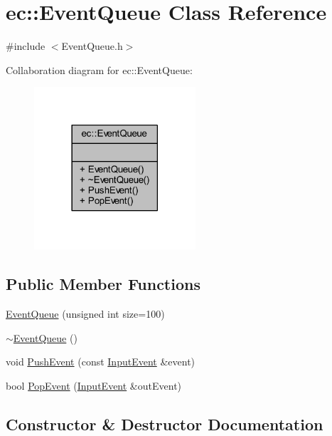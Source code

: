 \hypertarget{classec_1_1_event_queue}{}\section{ec\+:\+:Event\+Queue Class Reference}
\label{classec_1_1_event_queue}


{\ttfamily \#include $<$Event\+Queue.\+h$>$}



Collaboration diagram for ec\+:\+:Event\+Queue\+:
\nopagebreak
\begin{figure}[H]
\begin{center}
\leavevmode
\includegraphics[width=170pt]{classec_1_1_event_queue__coll__graph}
\end{center}
\end{figure}
\subsection*{Public Member Functions}
\begin{DoxyCompactItemize}
\item 
\mbox{\hyperlink{classec_1_1_event_queue_aee3a6823b58d2fbf23a5148d28dc6d2d}{Event\+Queue}} (unsigned int size=100)
\item 
\mbox{\hyperlink{classec_1_1_event_queue_a98fb5b9cf781f87dee6443831dc42e65}{$\sim$\+Event\+Queue}} ()
\item 
void \mbox{\hyperlink{classec_1_1_event_queue_a15813a52ffb9bc0f1cd161fdc6d651c9}{Push\+Event}} (const \mbox{\hyperlink{structec_1_1_input_event}{Input\+Event}} \&event)
\item 
bool \mbox{\hyperlink{classec_1_1_event_queue_ab8f80c9b10f94d621c9cbc9bbc2718ff}{Pop\+Event}} (\mbox{\hyperlink{structec_1_1_input_event}{Input\+Event}} \&out\+Event)
\end{DoxyCompactItemize}


\subsection{Constructor \& Destructor Documentation}
\mbox{\label{classec_1_1_event_queue_aee3a6823b58d2fbf23a5148d28dc6d2d}} 
